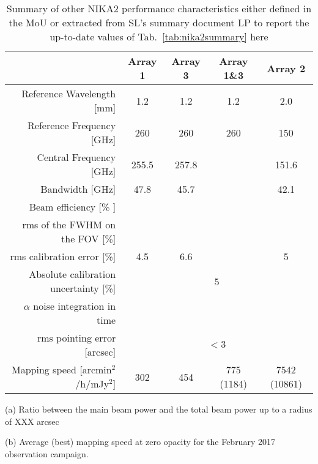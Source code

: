 \begin{table}[h]
  \caption[Secondary performance measurements]{Summary of other NIKA2 performance characteristics either defined in the MoU or extracted from SL's summary document {\color{magenta} LP to report the up-to-date values of Tab.~\ref{tab:nika2summary} here}}
  \label{tab:nika2summary_second}
  \begin{threeparttable}
    \begin{tabular}{|r|c|c|c|c|}
      \hline
      & Array 1 & Array 3  & Array 1\&3 & Array 2 \\
      \hline
      \hline
      Reference Wavelength  [mm]  &  1.2   &  1.2  & 1.2 & 2.0   \\
      Reference Frequency  [GHz]  &  260   &  260  & 260 & 150  \\
      Central Frequency [GHz]     &  255.5  &    257.8     &     &   151.6  \\
      Bandwidth         [GHz]     &   47.8  &     45.7     &     &    42.1  \\
      \hline
      Beam efficiency\tnote{a}\hspace{1mm} [\% ]    &        &    &     &    \\
      rms of the FWHM on the FOV [$\%$]   &   &    &   &  \\
      \hline 
      rms calibration error [\%]            & 4.5  & 6.6  &   & 5  \\
      \hline
      Absolute calibration uncertainty [\%] &  \multicolumn{4}{|c|}{5} \\
      \hline
      $\alpha$ noise integration in time\tnote{d}\hspace{1mm}  &   &   &   &  \\
      \hline
      rms pointing error    [arcsec]    & \multicolumn{4}{|c|}{$<3$}  \\
      \hline
      Mapping speed\tnote{b}\hspace{1mm} [arcmin$^2$/h/mJy$^2$] & 302  & 454  & 775 (1184)  & 7542 (10861)  \\
\hline

\end{tabular}
  \begin{tablenotes}
  \item[(a)] Ratio between the main beam power and the total beam power up to a radius of XXX arcsec
  \item[(b)] Average (best) mapping speed at zero opacity for the February 2017 observation campaign. 
  \end{tablenotes}
\end{threeparttable}
\end{table}

